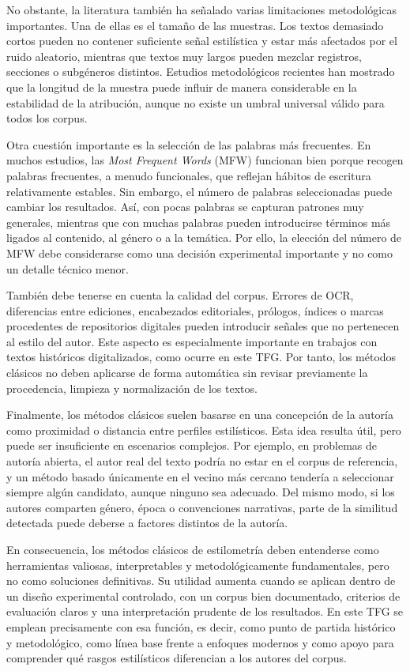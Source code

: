 \documentclass[IB]{TFUOC}%
\begin{document}
No obstante, la literatura también ha señalado varias limitaciones metodológicas importantes. Una de ellas es el tamaño de las muestras. Los textos demasiado cortos pueden no contener suficiente señal estilística y estar más afectados por el ruido aleatorio, mientras que textos muy largos pueden mezclar registros, secciones o subgéneros distintos. Estudios metodológicos recientes han mostrado que la longitud de la muestra puede influir de manera considerable en la estabilidad de la atribución, aunque no existe un umbral universal válido para todos los corpus\cite{eder2015does}.

Otra cuestión importante es la selección de las palabras más frecuentes. En muchos estudios, las \textit{Most Frequent Words} (MFW) funcionan bien porque recogen palabras frecuentes, a menudo funcionales, que reflejan hábitos de escritura relativamente estables. Sin embargo, el número de palabras seleccionadas puede cambiar los resultados. Así, con pocas palabras se capturan patrones muy generales, mientras que con muchas palabras pueden introducirse términos más ligados al contenido, al género o a la temática. Por ello, la elección del número de MFW debe considerarse como una decisión experimental importante y no como un detalle técnico menor.

También debe tenerse en cuenta la calidad del corpus. Errores de OCR, diferencias entre ediciones, encabezados editoriales, prólogos, índices o marcas procedentes de repositorios digitales pueden introducir señales que no pertenecen al estilo del autor. Este aspecto es especialmente importante en trabajos con textos históricos digitalizados, como ocurre en este TFG. Por tanto, los métodos clásicos no deben aplicarse de forma automática sin revisar previamente la procedencia, limpieza y normalización de los textos.

Finalmente, los métodos clásicos suelen basarse en una concepción de la autoría como proximidad o distancia entre perfiles estilísticos. Esta idea resulta útil, pero puede ser insuficiente en escenarios complejos. Por ejemplo, en problemas de autoría abierta, el autor real del texto podría no estar en el corpus de referencia, y un método basado únicamente en el vecino más cercano tendería a seleccionar siempre algún candidato, aunque ninguno sea adecuado. Del mismo modo, si los autores comparten género, época o convenciones narrativas, parte de la similitud detectada puede deberse a factores distintos de la autoría.

En consecuencia, los métodos clásicos de estilometría deben entenderse como herramientas valiosas, interpretables y metodológicamente fundamentales, pero no como soluciones definitivas. Su utilidad aumenta cuando se aplican dentro de un diseño experimental controlado, con un corpus bien documentado, criterios de evaluación claros y una interpretación prudente de los resultados. En este TFG se emplean precisamente con esa función, es decir, como punto de partida histórico y metodológico, como línea base frente a enfoques modernos y como apoyo para comprender qué rasgos estilísticos diferencian a los autores del corpus.
\end{document}
